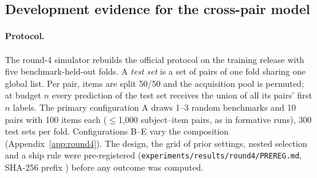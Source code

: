 \documentclass{article}
\begin{document}
\subsection{Development evidence for the cross-pair model}
\label{sec:dev}

\paragraph{Protocol.} The round-4 simulator rebuilds the official protocol on the training release with five benchmark-held-out folds. A \emph{test set} is a set of pairs of one fold sharing one global list. Per pair, items are split 50/50 and the acquisition pool is permuted; at budget $n$ every prediction of the test set receives the union of all its pairs' first $n$ labels. The primary configuration A draws 1--3 random benchmarks and 10 pairs with 100 items each ($\le$1,000 subject--item pairs, as in formative runs), 300 test sets per fold. Configurations B--E vary the composition (Appendix~\ref{app:round4}). The design, the grid of \XpGridN{} prior settings, nested selection and a ship rule were pre-registered (\texttt{experiments/results/round4/PREREG.md}, SHA-256 prefix \texttt{\XpPreregSha}) before any outcome was computed.

\begin{table}[t]
\caption{Round-4 simulation on the training release: Brier ALC by test-set configuration, units (test set, pair), 95\% cluster-bootstrap CIs over benchmarks. S0: our rounds 1--3 per-pair predictor as the evaluator runs it; S1: the same with the target pair's labels only; XP: cross-pair model (nested selection; level constants of \FmShipId); oracle: each pair's evaluation success rate as a constant.}
\label{tab:xpconfigs}
\centering\footnotesize\setlength{\tabcolsep}{3pt}
\end{table}
\end{document}
